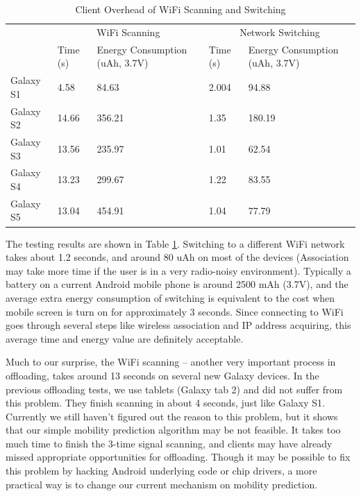 \documentclass[english]{tktltiki}
\begin{document}
\begin{table}[htbp]
\centering
\begin{tabular}{|l|p{50pt}|p{100pt}|p{50pt}|p{100pt}|}
  \hline
  & \multicolumn{2}{c|}{WiFi Scanning} & \multicolumn{2}{c|}{Network Switching} \\
  \cline{2-5}
  & Time (s) & Energy Consumption (uAh, 3.7V) & Time (s) & Energy Consumption (uAh, 3.7V)\\
  \hline
  Galaxy S1 & 4.58 & 84.63 & 2.004 & 94.88 \\
  \hline
  Galaxy S2 & 14.66 & 356.21 & 1.35 & 180.19 \\
  \hline
  Galaxy S3 & 13.56 & 235.97 & 1.01 & 62.54 \\
  \hline
  Galaxy S4 & 13.23 & 299.67 & 1.22 & 83.55 \\
  \hline
  Galaxy S5 & 13.04 & 454.91 & 1.04 & 77.79 \\
  \hline
\end{tabular}
\caption{Client Overhead of WiFi Scanning and Switching}
\label{tab:overhead}
\end{table}


The testing results are shown in Table \ref{tab:overhead}. Switching to a different WiFi network takes about 1.2 seconds, and around 80 uAh on most of the devices (Association may take more time if the user is in a very radio-noisy environment). Typically a battery on a current Android mobile phone is around 2500 mAh (3.7V), and the average extra energy consumption of switching is equivalent to the cost when mobile screen is turn on for approximately 3 seconds. Since connecting to WiFi goes through several steps like wireless association and IP address acquiring, this average time and energy value are definitely acceptable. 

Much to our surprise, the WiFi scanning -- another very important process in offloading, takes around 13 seconds on several new Galaxy devices. In the previous offloading tests, we use tablets (Galaxy tab 2) and did not suffer from this problem. They finish scanning in about 4 seconds, just like Galaxy S1. Currently we still haven't figured out the reason to this problem, but it shows that our simple mobility prediction algorithm may be not feasible. It takes too much time to finish the 3-time signal scanning, and clients may have already missed appropriate opportunities for offloading. Though it may be possible to fix this problem by hacking Android underlying code or chip drivers, a more practical way is to change our current mechanism on mobility prediction.
\end{document}

